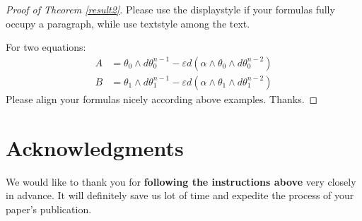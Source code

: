 \documentclass{aims}
\theoremstyle{definition}
\newcommand{\ep}{\varepsilon}
\begin{document}
\begin{proof}[Proof of Theorem \ref{result2}]
 Please use the displaystyle if your formulas fully
occupy a paragraph, while use textstyle among the text.

For two equations:
\begin{align*}
A &= \theta_0 \wedge d\theta_0^{n-1} - \ep d(\alpha \wedge \theta_0 \wedge d\theta_0^{n-2})\\
B&=\theta_1 \wedge d\theta_1^{n-1} - \ep d(\alpha \wedge \theta_1
\wedge d\theta_1^{n-2})
\end{align*}
Please align your formulas nicely according above examples. Thanks.
\end{proof}

\section*{Acknowledgments} We would like to thank you for \textbf{following
the instructions above} very closely in advance. It will definitely
save us lot of time and expedite the process of your paper's
publication.

\end{document}
